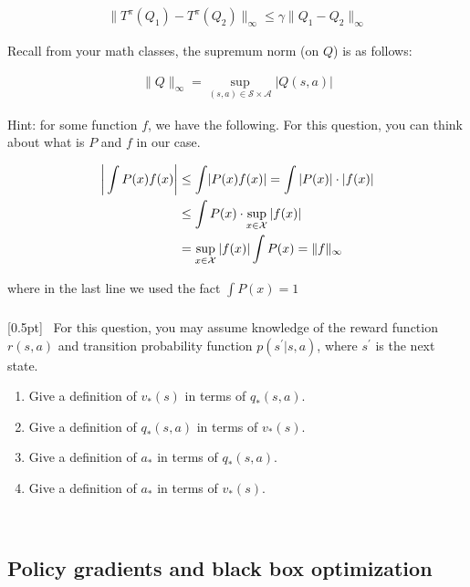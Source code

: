 \begin{align}
   \| T^\pi (Q_1) - T^\pi (Q_2) \|_{\infty}  \leq \gamma \|  Q_1 - Q_2 \|_{\infty}
\end{align}

Recall from your math classes, the supremum norm (on $Q$) is as follows:

\begin{align}
   \| Q \|_{\infty} =\sup_{(s,a) \in \mathcal{S \times A}} |Q(s,a)|
\end{align}

Hint: for some function $f$, we have the following. For this question, you can think about what is $P$ and $f$ in our case.

\begin{align}
    \bigg \lvert \int P(x)f(x) \bigg \rvert & \leq \int \lvert  P(x) f(x)\rvert = \int |P(x)| \cdot |f(x)| \notag 
    \\
    & \leq \int P(x) \cdot \sup_{x \in \mathcal{X}}|f(x)| \\
    & = \sup_{x \in \mathcal{X}}|f(x)| \int P(x) = \| f \|_{\infty} \notag
\end{align}

where in the last line we used the fact $\int P(x) = 1$ \\

\subsubsection{} {\color{blue} [0.5pt]} \ For this question, you may assume knowledge of the reward function $r(s,a)$ and transition probability function $p(s^{\prime}|s,a)$, where $s^{\prime}$ is the next state.

\begin{enumerate}
\item Give a definition of $v_*(s)$ in terms of $q_* (s,a)$. 
\item Give a definition of $q_* (s,a)$ in terms of $v_*(s)$. 
\item Give a definition of $a_*$ in terms of $q_*(s,a)$.
\item Give a definition of $a_*$ in terms of $v_*(s)$.
\end{enumerate} \\


\subsection{Policy gradients and black box optimization}

